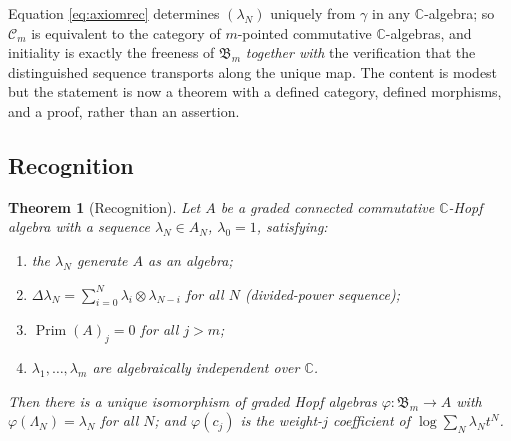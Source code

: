 \documentclass{article}
\newcommand{\tmem}[1]{{\em #1\/}}
\newcommand{\tmop}[1]{\ensuremath{\operatorname{#1}}}
\newcommand{\tmtextup}[1]{\text{{\upshape{#1}}}}
\newtheorem{theorem}{Theorem}
\newcommand{\Prim}{\tmop{Prim}}
\newcommand{\CA}{\mathfrak{B}}
\newcommand{\C}{\mathbb{C}}
\begin{document}
\begin{remark}
  \label{rem:initialmeaning}Equation \eqref{eq:axiomrec} determines
  $(\lambda_N)$ uniquely from $\gamma$ in any $\C$-algebra; so $\mathcal{C}_m$
  is equivalent to the category of $m$-pointed commutative $\C$-algebras, and
  initiality is exactly the freeness of $\CA_m$ {\tmem{together with}} the
  verification that the distinguished sequence transports along the unique
  map. The content is modest but the statement is now a theorem with a defined
  category, defined morphisms, and a proof, rather than an assertion.
\end{remark}

\subsection{Recognition}

\begin{theorem}
  [Recognition]\label{thm:recognition} Let $A$ be a graded connected
  commutative $\C$-Hopf algebra with a sequence $\lambda_N \in A_N$,
  $\lambda_0 = 1$, satisfying:
  \begin{enumerate}
    \item[\tmtextup{(G)}] the $\lambda_N$ generate $A$ as an algebra;
    
    \item[\tmtextup{(D)}] $\Delta \lambda_N = \sum_{i = 0}^N \lambda_i \otimes
    \lambda_{N - i}$ for all $N$ {\tmem{(divided-power sequence)}};
    
    \item[\tmtextup{(T)}] $\Prim (A)_j = 0$ for all $j > m$;
    
    \item[\tmtextup{(I)}] $\lambda_1, \ldots, \lambda_m$ are algebraically
    independent over $\C$.
  \end{enumerate}
  Then there is a unique isomorphism of graded Hopf algebras $\varphi : \CA_m
  \to A$ with $\varphi (\Lambda_N) = \lambda_N$ for all $N$; and $\varphi
  (c_j)$ is the weight-$j$ coefficient of $\log \sum_N \lambda_N t^N$.
\end{theorem}
\end{document}
